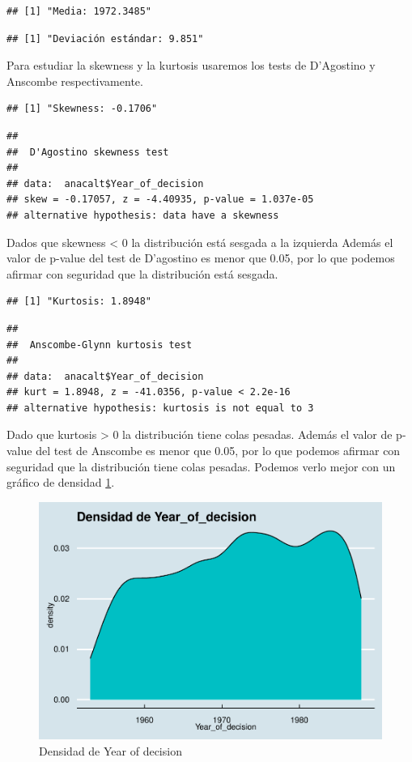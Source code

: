 \documentclass[
]{article}
\begin{document}
\begin{verbatim}
## [1] "Media: 1972.3485"
\end{verbatim}

\begin{verbatim}
## [1] "Deviación estándar: 9.851"
\end{verbatim}

Para estudiar la skewness y la kurtosis usaremos los tests de D'Agostino
y Anscombe respectivamente.

\begin{verbatim}
## [1] "Skewness: -0.1706"
\end{verbatim}

\begin{verbatim}
## 
##  D'Agostino skewness test
## 
## data:  anacalt$Year_of_decision
## skew = -0.17057, z = -4.40935, p-value = 1.037e-05
## alternative hypothesis: data have a skewness
\end{verbatim}

Dados que skewness \textless{} 0 la distribución está sesgada a la
izquierda Además el valor de p-value del test de D'agostino es menor que
0.05, por lo que podemos afirmar con seguridad que la distribución está
sesgada.

\begin{verbatim}
## [1] "Kurtosis: 1.8948"
\end{verbatim}

\begin{verbatim}
## 
##  Anscombe-Glynn kurtosis test
## 
## data:  anacalt$Year_of_decision
## kurt = 1.8948, z = -41.0356, p-value < 2.2e-16
## alternative hypothesis: kurtosis is not equal to 3
\end{verbatim}

Dado que kurtosis \textgreater{} 0 la distribución tiene colas pesadas.
Además el valor de p-value del test de Anscombe es menor que 0.05, por
lo que podemos afirmar con seguridad que la distribución tiene colas
pesadas. Podemos verlo mejor con un gráfico de densidad
\ref{fig:densidad_year}.

\begin{figure}

{\centering \includegraphics[width=0.5\linewidth]{anacalt-regresion_files/figure-latex/densidad_year-1} 

}

\caption{Densidad de Year of decision}\label{fig:densidad_year}
\end{figure}
\end{document}
